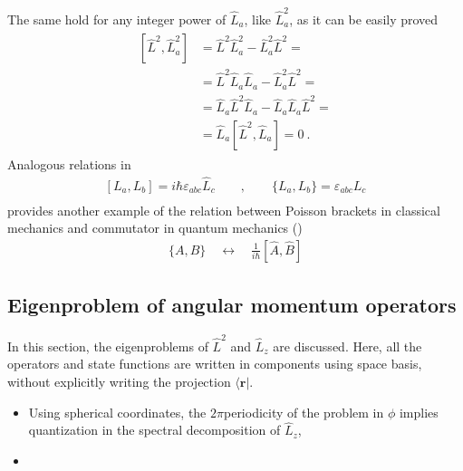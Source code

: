 \documentclass[letterpaper,10pt,english]{jupyterBook}
\begin{document}
\sphinxAtStartPar
The same hold for any integer power of \(\hat{L}_a\), like \(\hat{L}_a^2\), as it can be easily proved
\begin{equation*}
\begin{split}\begin{aligned}
  \left[ \hat{L}^2, \hat{L}^2_a \right]
  & = \hat{L}^2 \hat{L}_a^2 - \hat{L}_a^2 \hat{L}^2 = \\
  & = \hat{L}^2 \hat{L}_a \hat{L}_a - \hat{L}_a^2 \hat{L}^2 = \\
  & = \hat{L}_a \hat{L}^2 \hat{L}_a - \hat{L}_a \hat{L}_a \hat{L}^2 = \\
  & = \hat{L}_a [ \hat{L}^2,  \hat{L}_a ] = 0  \ .
\end{aligned}\end{split}
\end{equation*}
\sphinxAtStartPar
Analogous relations in 
\begin{equation*}
\begin{split}
  [ L_a, L_b ] = i \hbar \varepsilon_{abc} \hat{L}_c \qquad , \qquad \{ L_a, L_b \} = \varepsilon_{abc} L_c \\
\end{split}
\end{equation*}
\sphinxAtStartPar
provides another example of the relation between Poisson brackets in classical mechanics and commutator in quantum mechanics ()
\begin{equation*}
\begin{split}\{ A, B \} \quad \leftrightarrow \quad \frac{1}{i \hbar} [ \hat{A}, \hat{B} ]\end{split}
\end{equation*}

\subsection{Eigenproblem of angular momentum operators}
\label{\detokenize{ch/quantum-mechanics/angular-momentum/angular-momentum-spatial:eigenproblem-of-angular-momentum-operators}}
\sphinxAtStartPar
In this section, the eigenproblems of \(\hat{L}^2\) and \(\hat{L}_z\) are discussed. Here, all the operators and state functions are written in components using space basis, without explicitly writing the projection \(\langle \mathbf{r} |\).
\begin{itemize}
\item {} 
\sphinxAtStartPar
Using spherical coordinates, the \(2\pi\)\sphinxhyphen{}periodicity of the problem in \(\phi\) implies quantization in the spectral decomposition of \(\hat{L}_z\),

\item {} 
\end{itemize}
\end{document}
